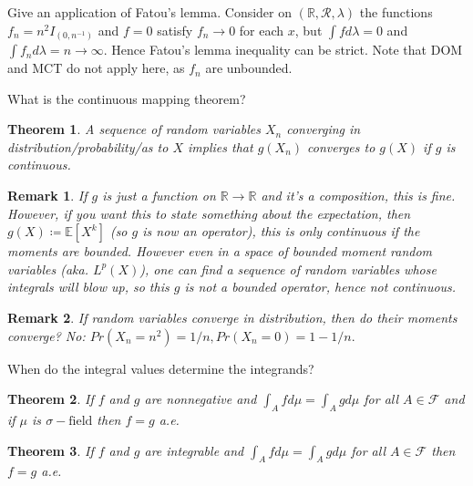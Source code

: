 \documentclass[avery5388,grid,frame]{flashcards}
\newcommand{\R}{\mathbb{R}}
\newcommand{\E}{\mathbb{E}}
\newcommand{\sigf}{\sigma-\text{field}}
\newcommand{\F}{\mathcal F}
\newtheorem*{theorem}{Theorem}
\newtheorem*{remark}{Remark}
\begin{document}
\begin{flashcard}
    {Give an application of Fatou's lemma.}
    Consider on $(\R, \mathcal R, \lambda)$ the functions $f_n = n^2 I_{(0,n^{-1})}$ and $f = 0$ satisfy $f_n \rightarrow 0$ for each $x$, but $\int f d\lambda = 0$ and $\int f_n d\lambda = n \rightarrow \infty$. Hence Fatou's lemma inequality can be strict. Note that DOM and MCT do not apply here, as $f_n$ are unbounded.
\end{flashcard}


\begin{flashcard}
    {What is the continuous mapping theorem?}
    \begin{theorem}
        A sequence of random variables $X_n$ converging in distribution/probability/as to $X$ implies that $g(X_n)$ converges to $g(X)$ if $g$ is continuous.
    \end{theorem}

    \begin{remark}
        If $g$ is just a function on $\R \rightarrow \R$ and it's a composition, this is fine. However, if you want this to state something about the expectation, then $g(X) \coloneqq \E[X^k]$ (so $g$ is now an operator), this is only continuous if the moments are bounded. However even in a space of bounded moment random variables (aka. $L^p(X)$), one can find a sequence of random variables whose integrals will blow up, so this $g$ is not a bounded operator, hence not continuous.
    \end{remark}
    \begin{remark}
        If random variables converge in distribution, then do their moments converge? No:
        $Pr(X_n = n^2) = 1/n, Pr(X_n = 0) = 1 - 1/n.$
    \end{remark}
\end{flashcard}


\begin{flashcard}
    {When do the integral values determine the integrands?}
    \begin{theorem}
        If $f$ and $g$ are nonnegative and $\int_A f d\mu = \int_A g d\mu$ for all $A \in \F$ and if $\mu$ is $\sigf$ then $f = g$ a.e.
    \end{theorem}
    \begin{theorem}
        If $f$ and $g$ are integrable and $\int_A f d\mu = \int_A g d\mu$ for all $A \in \F$ then $f = g$ a.e.
    \end{theorem}
\end{flashcard}
\end{document}
